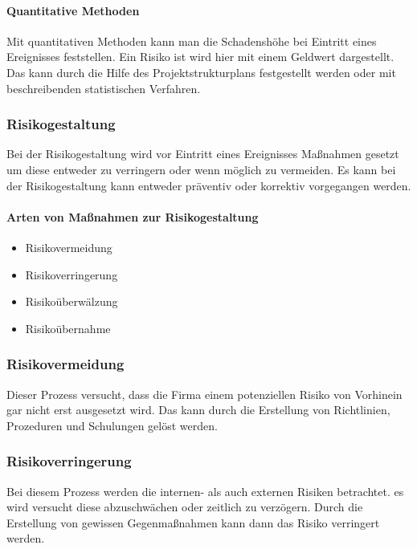 \paragraph{Quantitative Methoden}
Mit quantitativen Methoden kann man die Schadenshöhe bei Eintritt eines Ereignisses feststellen. Ein Risiko ist wird hier mit einem Geldwert dargestellt.
Das kann durch die Hilfe des Projektstrukturplans festgestellt werden oder mit beschreibenden statistischen Verfahren.


\subsubsection{Risikogestaltung}
Bei der Risikogestaltung wird vor Eintritt eines Ereignisses Maßnahmen gesetzt um diese entweder zu verringern oder wenn möglich zu vermeiden.
Es kann bei der Risikogestaltung kann entweder präventiv oder korrektiv vorgegangen werden.

\paragraph{Arten von Maßnahmen zur Risikogestaltung}
\begin{itemize}
	\item Risikovermeidung
	\item Risikoverringerung
	\item Risikoüberwälzung
	\item Risikoübernahme
\end{itemize}

\subsubsection{Risikovermeidung}
Dieser Prozess versucht, dass die Firma einem potenziellen Risiko von Vorhinein gar nicht erst ausgesetzt wird. Das kann durch die Erstellung von Richtlinien, Prozeduren und Schulungen gelöst werden.

\subsubsection{Risikoverringerung}
Bei diesem Prozess werden die internen- als auch externen Risiken betrachtet. es wird versucht diese abzuschwächen oder zeitlich zu verzögern. Durch die Erstellung von gewissen Gegenmaßnahmen kann dann das Risiko verringert werden.

